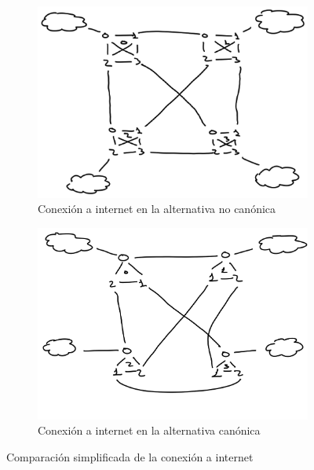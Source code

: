 \documentclass[%
    school=etsisi,%
    degree=61TI,%
]{upm-report}
\begin{document}
\begin{figure}
    \centering
    \begin{subfigure}{0.49\textwidth}
        \includegraphics[width=\linewidth]{figures/no-canonica-internet.png}
        \caption{\label{fig:no-canonica-internet} Conexión a internet en la alternativa no canónica}
    \end{subfigure}
    \begin{subfigure}{0.49\textwidth}
        \includegraphics[width=\linewidth]{figures/canonica-internet.png}
        \caption{\label{fig:canonica-internet} Conexión a internet en la alternativa canónica}
    \end{subfigure}
    \caption{\label{fig:conexion-internet} Comparación simplificada de la conexión a internet}
\end{figure}
\end{document}
